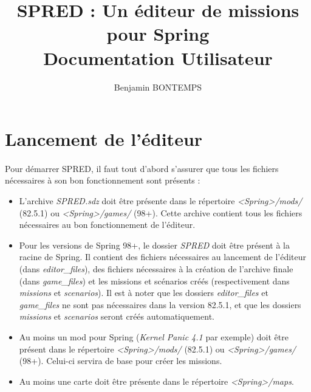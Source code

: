 \documentclass[a4paper]{article}
\title{SPRED : Un éditeur de missions pour Spring\\ Documentation Utilisateur}
\author{Benjamin BONTEMPS}
\begin{document}
\maketitle

\tableofcontents

\newpage

\section{Lancement de l'éditeur}
\paragraph{ }
Pour démarrer SPRED, il faut tout d'abord s'assurer que tous les fichiers nécessaires à son bon fonctionnement sont présents :
\begin{itemize}
\item L'archive \textit{SPRED.sdz} doit être présente dans le répertoire \textit{<Spring>/mods/} (82.5.1) ou \textit{<Spring>/games/} (98+). Cette archive contient tous les fichiers nécessaires au bon fonctionnement de l'éditeur.
\item Pour les versions de Spring 98+, le dossier \textit{SPRED} doit être présent à la racine de Spring. Il contient des fichiers nécessaires au lancement de l'éditeur (dans \textit{editor\_files}), des fichiers nécessaires à la création de l'archive finale (dans \textit{game\_files}) et les missions et scénarios créés (respectivement dans \textit{missions} et \textit{scenarios}). Il est à noter que les dossiers \textit{editor\_files} et \textit{game\_files} ne sont pas nécessaires dans la version 82.5.1, et que les dossiers \textit{missions} et \textit{scenarios} seront créés automatiquement.
\item Au moins un mod pour Spring (\textit{Kernel Panic 4.1} par exemple) doit être présent dans le répertoire \textit{<Spring>/mods/} (82.5.1) ou \textit{<Spring>/games/} (98+). Celui-ci servira de base pour créer les missions.
\item Au moins une carte doit être présente dans le répertoire \textit{<Spring>/maps}.
\end{itemize}
\end{document}
